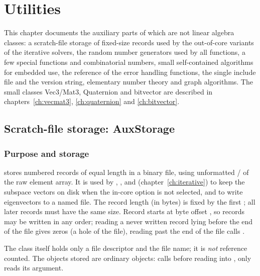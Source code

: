 \chapter{Utilities}\label{ch:utilities}

This chapter documents the auxiliary parts of \LA{} which are not linear algebra classes: a scratch-file storage of
fixed-size records used by the out-of-core variants of the iterative solvers, the random number generators used by all
 functions, a few special functions and combinatorial numbers, small self-contained algorithms for
embedded use, the reference of the error handling functions, the single include file  and the version
string, elementary number theory and graph algorithms. The small classes Vec3/Mat3, Quaternion and bitvector are described in
chapters~\ref{ch:vecmat3}, \ref{ch:quaternion} and \ref{ch:bitvector}.

\section{Scratch-file storage: AuxStorage}\label{sec:utilities:auxstorage}

\subsection{Purpose and storage}
 stores numbered records of equal length in a binary file, using unformatted /
of the raw element array. It is used by , ,  and 
(chapter~\ref{ch:iterative}) to keep the subspace vectors on disk when the in-core option is not selected, and to write
eigenvectors to a named file. The record length (in bytes) is fixed by the first ; all later records must have
the same size. Record  starts at byte offset , so records may be written in any order; reading
a never written record lying before the end of the file gives zeros (a hole of the file), reading past the end of the file
calls .

The class itself holds only a file descriptor and the file name; it is \emph{not} reference counted. The objects stored are
ordinary \LA{} objects:  calls  before reading into ,  only reads
its argument.

